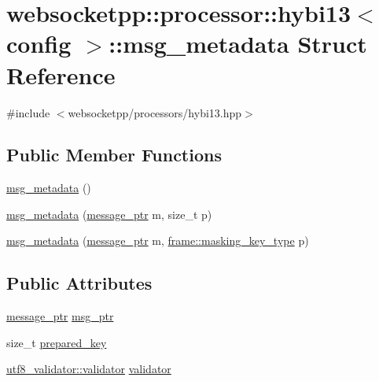 \hypertarget{structwebsocketpp_1_1processor_1_1hybi13_1_1msg__metadata}{}\section{websocketpp\+:\+:processor\+:\+:hybi13$<$ config $>$\+:\+:msg\+\_\+metadata Struct Reference}
\label{structwebsocketpp_1_1processor_1_1hybi13_1_1msg__metadata}


{\ttfamily \#include $<$websocketpp/processors/hybi13.\+hpp$>$}

\subsection*{Public Member Functions}
\begin{DoxyCompactItemize}
\item 
\hyperlink{structwebsocketpp_1_1processor_1_1hybi13_1_1msg__metadata_abd8448ece130e0e795f25a492d2efa73}{msg\+\_\+metadata} ()
\item 
\hyperlink{structwebsocketpp_1_1processor_1_1hybi13_1_1msg__metadata_a386f3ee3c7e1779a8da19385cf14a418}{msg\+\_\+metadata} (\hyperlink{classwebsocketpp_1_1processor_1_1hybi13_a0571e90d7261ab722f695feb7dd48fed}{message\+\_\+ptr} m, size\+\_\+t p)
\item 
\hyperlink{structwebsocketpp_1_1processor_1_1hybi13_1_1msg__metadata_ad5e5baeb6fe05bea4f6569c3635558f8}{msg\+\_\+metadata} (\hyperlink{classwebsocketpp_1_1processor_1_1hybi13_a0571e90d7261ab722f695feb7dd48fed}{message\+\_\+ptr} m, \hyperlink{namespacewebsocketpp_1_1frame_a8bdac8ec44c78c027fcf55aa3bad3f86}{frame\+::masking\+\_\+key\+\_\+type} p)
\end{DoxyCompactItemize}
\subsection*{Public Attributes}
\begin{DoxyCompactItemize}
\item 
\hyperlink{classwebsocketpp_1_1processor_1_1hybi13_a0571e90d7261ab722f695feb7dd48fed}{message\+\_\+ptr} \hyperlink{structwebsocketpp_1_1processor_1_1hybi13_1_1msg__metadata_a49e276abf3be14de45a9111cb13e3d81}{msg\+\_\+ptr}
\item 
size\+\_\+t \hyperlink{structwebsocketpp_1_1processor_1_1hybi13_1_1msg__metadata_a4c0cf4af697b0a12396ca5570a888ec1}{prepared\+\_\+key}
\item 
\hyperlink{classwebsocketpp_1_1utf8__validator_1_1validator}{utf8\+\_\+validator\+::validator} \hyperlink{structwebsocketpp_1_1processor_1_1hybi13_1_1msg__metadata_a283c8d119c2c9f2543a2247b465c9416}{validator}
\end{DoxyCompactItemize}



